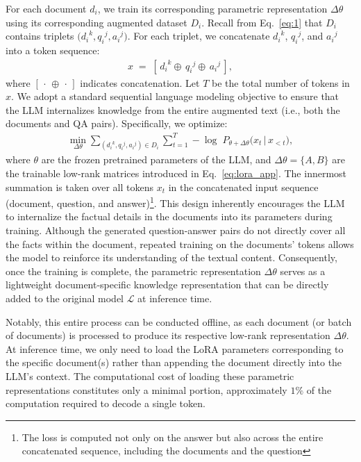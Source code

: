 \documentclass[sigconf,natbib=true,anonymous=false]{acmart}
\begin{document}
For each document \(d_i\), we train its corresponding parametric representation \(\Delta \theta\) using its corresponding augmented dataset \({D}_i\). 
Recall from Eq.~\ref{eq:1} that \({D}_i\) contains triplets \(\bigl({d_i}^k, {q_i}^j, {a_i}^j\bigr)\).
For each triplet, we concatenate \({d_i}^k\), \({q_i}^j\), and \({a_i}^j\) into a token sequence:
%
\begin{align}
    x \;=\; [\,{d_i}^k \oplus \, {q_i}^j  \oplus \, {a_i}^j\,],
\end{align}
%
where \([\,\cdot\,\oplus\,\cdot\,]\) indicates concatenation. Let \(T\) be the total number of tokens in \(x\).
We adopt a standard sequential language modeling objective to ensure that the LLM internalizes knowledge from the entire augmented text (i.e., both the documents and QA pairs). Specifically, we optimize:
%
\begin{align}
    \label{eq:lm_training}
    \min_{\Delta \theta} \sum_{({d_i}^k, {q_i}^j, {a_i}^j) \in {D}_i} 
    \sum_{t=1}^{T} 
    -\log \; P_{\theta + \Delta \theta}\bigl(x_t \,\big|\, x_{<t}\bigr),
\end{align}
%
where \(\theta\) are the frozen pretrained parameters of the LLM, and \(\Delta \theta = \{A, B\}\) are the trainable low-rank matrices introduced in Eq.~\ref{eq:lora_app}. 
The innermost summation is taken over all tokens \(x_t\) in the concatenated input sequence (document, question, and answer)\footnote{The loss is computed not only on the answer but also across the entire concatenated sequence, including the documents and the question}.
This design inherently encourages the LLM to {internalize} the factual details in the documents into its parameters during training.
Although the generated question-answer pairs do not directly cover all the facts within the document, repeated training on the documents' tokens allows the model to reinforce its understanding of the textual content. 
Consequently, once the training is complete, the parametric representation \(\Delta \theta\) serves as a lightweight document-specific knowledge representation that can be directly added to the original model \(\mathcal{L}\) at inference time.

Notably, this entire process can be conducted offline, as each document (or batch of documents) is processed to produce its respective low-rank representation \(\Delta \theta\). 
At inference time, we only need to load the LoRA parameters corresponding to the specific document(s) rather than appending the document directly into the LLM’s context. 
The computational cost of loading these parametric representations constitutes only a minimal portion, approximately \textbf{$1\%$} of the computation required to decode a single token.
\end{document}
